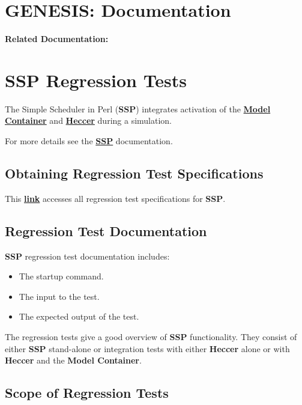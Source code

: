 \documentclass[12pt]{article}
\begin{document}
\section*{GENESIS: Documentation}

{\bf Related Documentation:}

\section*{SSP Regression Tests}

The Simple Scheduler in Perl ({\bf SSP}) integrates activation of the \href{../model-container/model-container.tex}{\bf Model Container} and \href{../heccer/heccer.tex}{\bf Heccer} during a simulation.

For more details see the \href{../ssp/ssp.tex}{\bf SSP} documentation.

\subsection*{Obtaining Regression Test Specifications}

This \href{http://www.neurospaces.org/neurospaces_project/studio/tests/html/index.html}{\bf link} accesses all regression test specifications for {\bf SSP}.

\subsection*{Regression Test Documentation}

{\bf SSP} regression test documentation includes:
\begin{itemize}
\item The startup command.
\item The input to the test.
\item The expected output of the test.
\end{itemize}
The regression tests give a good overview of {\bf SSP} functionality. They consist of either {\bf SSP} stand-alone or integration tests with either {\bf Heccer} alone or with {\bf Heccer} and the {\bf Model Container}.

\subsection*{Scope of Regression Tests}
\end{document}
